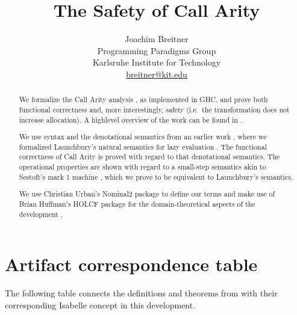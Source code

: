 \documentclass[11pt,a4paper,parskip=half]{scrartcl}
\begin{document}
\title{The Safety of Call Arity}
\author{Joachim Breitner\\
Programming Paradigms Group\\
Karlsruhe Institute for Technology\\
\url{breitner@kit.edu}}
\maketitle


\begin{abstract}
We formalize the Call Arity analysis \cite{tfp}, as implemented in GHC, and prove both functional correctness and, more interestingly, safety (i.e.\ the transformation does not increase allocation). A highlevel overview of the work can be found in \cite{call-arity-haskell15}.

We use syntax and the denotational semantics from an earlier work \cite{breitner2013}, where we formalized Launchbury's natural semantics for lazy evaluation \cite{launchbury}. 
The functional correctness of Call Arity is proved with regard to that denotational semantics.
The operational properties are shown with regard to a small-step semantics akin to Sestoft's mark 1 machine \cite{sestoft}, which we prove to be equivalent to Launchbury's semantics.

We use Christian Urban's Nominal2 package \cite{nominal} to define our terms and make use of Brian Huffman's HOLCF package for the domain-theoretical aspects of the development \cite{holcf}.

\end{abstract}

\section*{Artifact correspondence table}
\label{sec:table}

The following table connects the definitions and theorems from \cite{call-arity-haskell15} with their corresponding Isabelle concept in this development.

\newcommand{\seetheory}[1]{\hyperref[sec_#1]{#1}}
\end{document}
